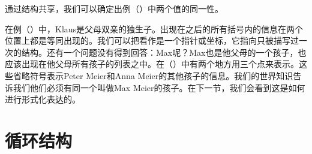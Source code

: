 通过结构共享，我们可以确定出例（）中两个值的同一性。
\begin{figure}
\ea
{}
\z
\vspace{-\baselineskip}
\end{figure}%
在例（）中，Klaus是父母双亲的独生子。出现在之后的所有括号内的信息在两个位置上都是等同出现的。我们可以把看作是一个指针或坐标，它指向只被描写过一次的结构。还有一个问题没有得到回答：Max呢？Max也是他父母的一个孩子，也应该出现在他父母所有孩子的列表之中。在（）中有两个地方用三个点来表示。这些省略符号表示Peter Meier和Anna Meier的其他孩子的信息。我们的世界知识告诉我们他们必须有同一个叫做Max Meier的孩子。在下一节，我们会看到这是如何进行形式化表达的。

\section{循环结构}
\label{sec-cyclic-fd}

